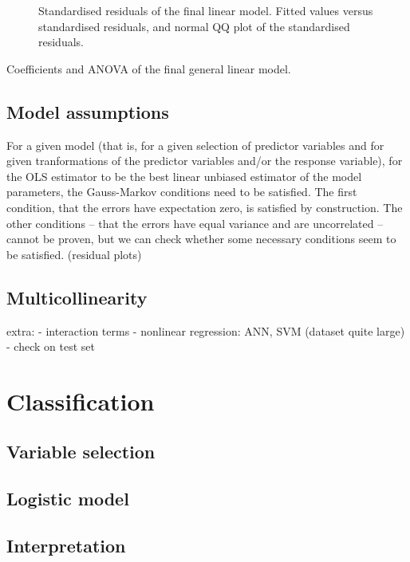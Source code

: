 \documentclass[a4paper, 12pt]{article}
\newcommand{\wide}[1]{\makebox[\textwidth][c]{#1}%
}
\newcommand{\widedoublefig}[2]{\wide{
  \centering
  \begin{subfigure}[b]{0.65\textwidth}
    \texttt{[image: \#1]}
  \end{subfigure}
  \begin{subfigure}[b]{0.65\textwidth}
    \texttt{[image: \#2]}
  \end{subfigure}
  }
}
\begin{document}
\begin{figure}
  \widedoublefig
  {img/post-bc-response_post-removal_fitted-stdres}
  {img/post-bc-response_post-removal_qq}
  \caption{Standardised residuals of the final linear model. Fitted values versus standardised residuals, and normal QQ plot of the standardised residuals.}
  \label{post-bc-response_post-removal}
\end{figure}

\begin{table}
\centering
\wide{}
\caption{Coefficients and ANOVA of the final general linear model.}
\label{table:lm}
\end{table}


\subsection*{Model assumptions}

For a given model (that is, for a given selection of predictor variables and for given tranformations of the predictor variables and/or the response variable), for the OLS estimator to be the best linear unbiased estimator of the model parameters, the Gauss-Markov conditions need to be satisfied. The first condition, that the errors have expectation zero, is satisfied by construction. The other conditions -- that the errors have equal variance and are uncorrelated -- cannot be proven, but we can check whether some necessary conditions seem to be satisfied.
(residual plots)

\subsection*{Multicollinearity}

extra:
- interaction terms
- nonlinear regression: ANN, SVM (dataset quite large)
- check on test set

\section{Classification}
\subsection*{Variable selection}
\subsection*{Logistic model}
\subsection*{Interpretation}
\end{document}
